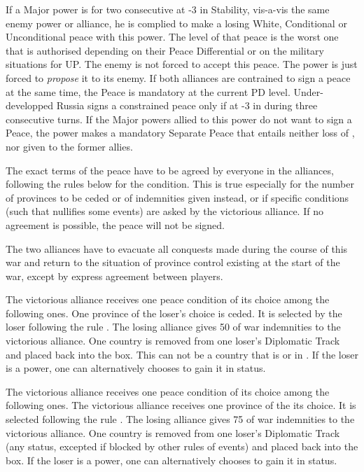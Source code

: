  If a Major power is for two consecutive at -3 in
Stability, vis-a-vis the same enemy power or alliance, he is complied to make
a losing White, Conditional or Unconditional peace with this power. The level
of that peace is the worst one that is authorised depending on their Peace
Differential or on the military situations for UP.
\bparag The enemy is not forced to accept this peace. The power is just forced
to \emph{propose} it to its enemy.
\bparag If both alliances are contrained to sign a peace at the same time, the
Peace is mandatory at the current PD level.
\bparag Under-developped Russia signs a constrained peace only if at -3 in
\STAB during three consecutive turns.
\bparag If the Major powers allied to this power do not want to sign a Peace,
the power makes a mandatory Separate Peace that entails neither loss of \STAB,
nor \CB given to the former allies.

The exact terms of the peace have to be agreed by everyone in the alliances,
following the rules below for the condition. This is true especially for the
number of provinces to be ceded or of indemnities given instead, or if
specific conditions (such that nullifies some events) are asked by the
victorious alliance. If no agreement is possible, the peace will not be
signed.

The two alliances have to evacuate all conquests made during the course of
this war and return to the situation of province control existing at the start
of the war, except by express agreement between players.

\bparag The victorious alliance receives one peace condition of its choice
among the following ones.
 One province of the loser's choice is ceded.  It
is selected by the loser following the rule .
\bparag[Indemnities]
The losing alliance gives 50 \ducats of war indemnities to the victorious
alliance.
One country is removed from one loser's Diplomatic Track and placed back into
the \Neutral box. This can not be a country that is \VASSAL or in \ANNEXION.
If the loser is a \MIN power, one can alternatively chooses to gain it in \MR
status.

\bparag The victorious alliance receives one peace condition of its choice
among the following ones.
 The victorious alliance receives one province of
the its choice. It is selected following the rule .
\bparag[Indemnities]
The losing alliance gives 75 \ducats of war indemnities to the victorious
alliance.
One country is removed from one loser's Diplomatic Track (any status, excepted
if blocked by other rules of events) and placed back into the \Neutral box.
If the loser is a \MIN power, one can alternatively chooses to gain it in \MR
status.

